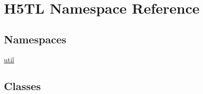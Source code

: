 \hypertarget{namespace_h5_t_l}{\section{H5\-T\-L Namespace Reference}
\label{namespace_h5_t_l}
}
\subsection*{Namespaces}
\begin{DoxyCompactItemize}
\item 
\hyperlink{namespace_h5_t_l_1_1util}{util}
\end{DoxyCompactItemize}
\subsection*{Classes}
